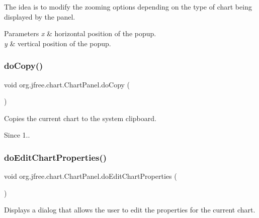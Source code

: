 The idea is to modify the zooming options depending on the type of chart being displayed by the panel.


\begin{DoxyParams}{Parameters}
{\em x} & horizontal position of the popup. \\
\hline
{\em y} & vertical position of the popup. \\
\hline
\end{DoxyParams}
\mbox{\label{classorg_1_1jfree_1_1chart_1_1_chart_panel_a83056c7e30f254d07d5d7e206daa33f8}} 
\subsubsection{\texorpdfstring{do\+Copy()}{doCopy()}}
{\footnotesize\ttfamily void org.\+jfree.\+chart.\+Chart\+Panel.\+do\+Copy (\begin{DoxyParamCaption}{ }\end{DoxyParamCaption})}

Copies the current chart to the system clipboard.

\begin{DoxySince}{Since}
1.. 
\end{DoxySince}
\mbox{\label{classorg_1_1jfree_1_1chart_1_1_chart_panel_a437151c21cb6a34197abba1597d7d9d8}} 
\subsubsection{\texorpdfstring{do\+Edit\+Chart\+Properties()}{doEditChartProperties()}}
{\footnotesize\ttfamily void org.\+jfree.\+chart.\+Chart\+Panel.\+do\+Edit\+Chart\+Properties (\begin{DoxyParamCaption}{ }\end{DoxyParamCaption})}

Displays a dialog that allows the user to edit the properties for the current chart.

